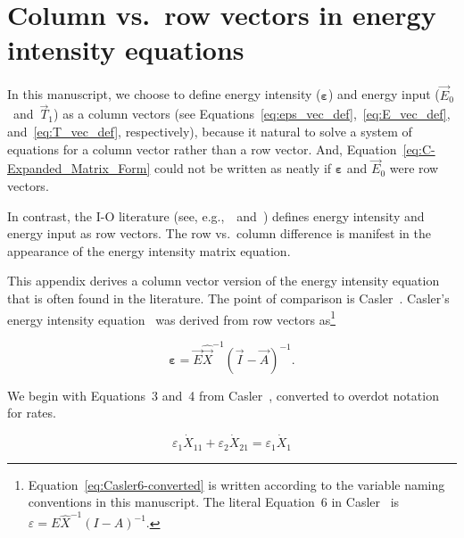 %
%
%
\chapter{Column vs.\ row vectors in energy intensity equations}
\label{chap:Casler} 


In this manuscript, we choose to define 
energy intensity ($\bm{\varepsilon}$) and 
energy input ($\vec{E}_{0}$~and~$\vec{T}_{1}$)
as a column vectors (see Equations~\ref{eq:eps_vec_def},~\ref{eq:E_vec_def}, 
and~\ref{eq:T_vec_def}, respectively),
because it natural to solve a system of equations
for a column vector rather than a row vector.
And, Equation~\ref{eq:C-Expanded_Matrix_Form} could not
be written as neatly if $\bm{\varepsilon}$ and $\vec{E}_{0}$
were row vectors.

In contrast, the I-O literature (see, 
e.g.,~\cite{Casler1984}~and~\cite{Bullard1978})
defines energy intensity and energy input
as row vectors. 
The row vs.\ column difference is manifest in the appearance 
of the energy intensity matrix equation.

This appendix derives a column vector version of the energy intensity equation
that is often found in the literature.
The point of comparison is Casler~\cite{Casler1984}.
Casler's energy intensity equation~\cite[Equation 6]{Casler1984} 
was derived from row vectors 
as\footnote{Equation~\ref{eq:Casler6-converted} is written according
to the variable naming conventions in this manuscript.
The literal Equation~6 in Casler~\cite{Casler1984} is
$
\varepsilon
= E \hat{X}^{-1} {(I - A)}^{-1}.
$
}

\begin{equation} \label{eq:Casler6-converted}
	\bm{\varepsilon}
	= \vec{E} 
		\hat{\vec{X}}^{-1}
		{(\vec{I} - \vec{A})}^{-1}.
\end{equation}

We begin with Equations~3 and~4 from Casler~\cite{Casler1984},
converted to overdot notation for rates.

\begin{equation} \label{eq:Casler-3}
	\varepsilon_{1} \dot{X}_{11}
	+ \varepsilon_{2} \dot{X}_{21}
	= \varepsilon_{1} \dot{X}_{1}
\end{equation}

